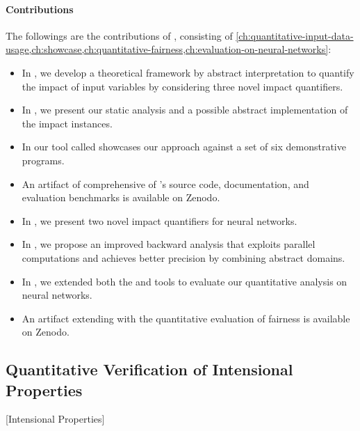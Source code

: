 \paragraph{Contributions}
The followings are the contributions of , consisting of \cref{ch:quantitative-input-data-usage,ch:showcase,ch:quantitative-fairness,ch:evaluation-on-neural-networks}:

\begin{itemize}
  \item In , we develop a theoretical framework by abstract interpretation to quantify the impact of input variables by considering three novel impact quantifiers.
  \item In , we present our static analysis and a possible abstract implementation of the impact instances.
  \item In  our tool called \impatto{} showcases our approach against a set of six demonstrative programs.
  \item An artifact of \impatto{} comprehensive of \impatto's source code, documentation, and evaluation benchmarks is available on Zenodo\sidenote{\impattozenodo}.
  \item In , we present two novel impact quantifiers for neural networks.
  \item In , we propose an improved backward analysis that exploits parallel computations and achieves better precision by combining abstract domains.
  \item In , we extended both the \impatto{} and \libra\sidenote{\libraurl} tools to evaluate our quantitative analysis on neural networks.
  \item An artifact extending \libra{} with the quantitative evaluation of fairness is available on Zenodo\sidenote{\librazenodo}.
\end{itemize}

\subsection{Quantitative Verification of Intensional Properties}[Intensional Properties]


